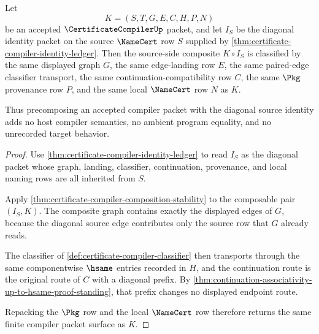 \begin{theorem}
\label{thm:certificate-compiler-left-identity-unit}
Let
$$
K=(S,T,G,E,C,H,P,N)
$$
be an accepted $\CertificateCompilerUp$ packet, and let $I_S$ be the diagonal
identity packet on the source $\NameCert$ row $S$ supplied by
\autoref{thm:certificate-compiler-identity-ledger}. Then the source-side
composite $K\circ I_S$ is classified by the same displayed graph $G$, the same
edge-landing row $E$, the same paired-edge classifier transport, the same
continuation-compatibility row $C$, the same $\Pkg$ provenance row $P$, and
the same local $\NameCert$ row $N$ as $K$.

Thus precomposing an accepted compiler packet with the diagonal source
identity adds no host compiler semantics, no ambient program equality, and no
unrecorded target behavior.
\end{theorem}
\begin{proof}
Use \autoref{thm:certificate-compiler-identity-ledger} to read $I_S$ as the
diagonal packet whose graph, landing, classifier, continuation, provenance,
and local naming rows are all inherited from $S$.

Apply \autoref{thm:certificate-compiler-composition-stability} to the
composable pair $(I_S,K)$. The composite graph contains exactly the displayed
edges of $G$, because the diagonal source edge contributes only the source row
that $G$ already reads.

The classifier of \autoref{def:certificate-compiler-classifier} then transports
through the same componentwise $\hsame$ entries recorded in $H$, and the
continuation route is the original route of $C$ with a diagonal prefix. By
\autoref{thm:continuation-associativity-up-to-hsame-proof-standing}, that
prefix changes no displayed endpoint route.

Repacking the $\Pkg$ row and the local $\NameCert$ row therefore returns the
same finite compiler packet surface as $K$.
\end{proof}

